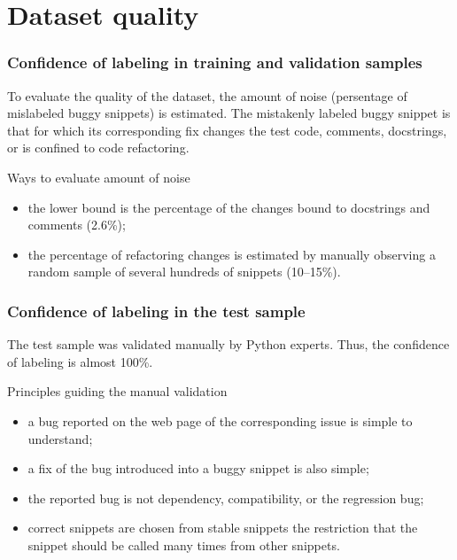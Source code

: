 \documentclass{beamer}
\begin{document}
\section{Dataset quality}


\begin{frame}
\frametitle{Confidence of labeling in training and validation samples}


To evaluate the quality of the dataset, the amount of noise (persentage of mislabeled buggy snippets) is estimated.
The mistakenly labeled buggy snippet is that for which its corresponding fix changes the test code, comments, docstrings, or is confined to code refactoring.

\begin{block}{Ways to evaluate amount of noise}
\begin{itemize}
\item the lower bound is the percentage of the changes bound to docstrings and
comments (2.6\%);
\item the percentage of refactoring changes is estimated by manually observing a random sample of several hundreds of snippets (10–15\%).
\end{itemize}
\end{block}

\end{frame}

\begin{frame}
\frametitle{Confidence of labeling in the test sample}

The test sample was validated manually by Python experts. Thus, the confidence of labeling is almost 100\%.

\begin{block}{Principles guiding the manual validation}
\begin{itemize}
\item a bug reported on the web page of the corresponding
issue is simple to understand;
\item a fix of the bug introduced into a buggy snippet is also simple;
\item the reported bug is not dependency, compatibility, or the
regression bug;
\item correct snippets are chosen from stable snippets the restriction that
the snippet should be called many times from other snippets.
\end{itemize}
\end{block}


\end{frame}
\end{document}
